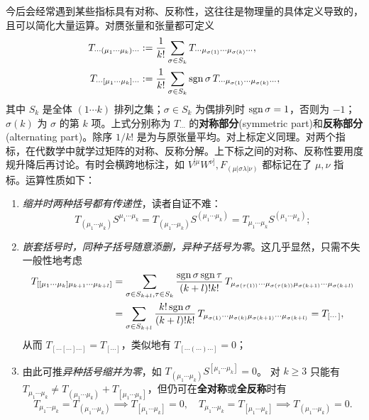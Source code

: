 今后会经常遇到某些指标具有对称、反称性，这往往是物理量的具体定义导致的，且可以简化大量运算。对赝张量和张量都可定义
\begin{align}
    T_{\cdots(\mu_1\cdots\mu_k)\cdots}&:=\frac{1}{k!}\sum_{\sigma\in S_k} T_{\cdots\mu_{\sigma(1)}\cdots\mu_{\sigma(k)}\cdots},\\
    T_{\cdots[\mu_1\cdots\mu_k]\cdots}&:=\frac{1}{k!}\sum_{\sigma\in S_k} \operatorname{sgn}\sigma\,T_{\cdots\mu_{\sigma(1)}\cdots\mu_{\sigma(k)}\cdots},
\end{align}
其中 $S_k$ 是全体 $(1\cdots k)$ 排列之集；$\sigma\in S_k$ 为偶排列时 $\operatorname{sgn}\sigma=1$，否则为 $-1$；$\sigma(k)$ 为 $\sigma$ 的第 $k$ 项。上式分别称为 $T_{\cdots}$ 的\textbf{对称部分}(symmetric part)和\textbf{反称部分}(alternating part)。除序 $1/k!$ 是为与原张量平均。对上标定义同理。对两个指标，在代数学中就学过矩阵的对称、反称分解。上下标之间的对称、反称性要用度规升降后再讨论。有时会横跨地标注，如 $V^{[\mu}W^{\nu]},F_{(\mu|\sigma\lambda|\nu)}$ 都标记在了 $\mu,\nu$ 指标。运算性质如下：
\begin{enumerate}
    \item \textit{缩并时两种括号都有传递性}，读者自证不难：
    \[T_{(\mu_1\cdots\mu_k)}S^{\mu_1\cdots\mu_k}=T_{(\mu_1\cdots\mu_k)}S^{(\mu_1\cdots\mu_k)}=T_{\mu_1\cdots\mu_k}S^{(\mu_1\cdots\mu_k)};\]
    \item \textit{嵌套括号时，同种子括号随意添删，异种子括号为零}。这几乎显然，只需不失一般性地考虑
    \begin{align*}
        T_{[[\mu_1\cdots\mu_k]\mu_{k+1}\cdots\mu_{k+l}]}&=\sum_{\sigma\in S_{k+l},\tau\in S_k}\frac{\operatorname{sgn}\sigma\operatorname{sgn}\tau}{(k+l)!k!}\,T_{\mu_{\sigma(\tau(1))}\cdots\mu_{\sigma(\tau(k))}\mu_{\sigma(k+1)}\cdots\mu_{\sigma(k+l)}}\\
        &=\sum_{\sigma\in S_{k+l}}\frac{k!\operatorname{sgn}\sigma}{(k+l)!k!}\,T_{\mu_{\sigma(1)}\cdots\mu_{\sigma(k)}\mu_{\sigma(k+1)}\cdots\mu_{\sigma(k+l)}}=T_{[\cdots]},
    \end{align*}
    从而 $T_{[\cdots[\cdots]\cdots]}=T_{[\cdots]}$，类似地有 $T_{[\cdots(\cdots)\cdots]}=0$；
    \item 由此可推\textit{异种括号缩并为零}，如 $T_{(\mu_1\cdots\mu_k)}S^{[\mu_1\cdots\mu_k]}=0$。
    对 $k\geqslant 3$ 只能有 $T_{\mu_1\cdots\mu_k}\ne T_{(\mu_1\cdots\mu_k)}+T_{[\mu_1\cdots\mu_k]}$，但仍可在\textbf{全对称}或\textbf{全反称}时有
    \[T_{\mu_1\cdots\mu_k}=T_{(\mu_1\cdots\mu_k)}\implies T_{[\mu_1\cdots\mu_k]}=0,\quad
        T_{\mu_1\cdots\mu_k}=T_{[\mu_1\cdots\mu_k]}\implies T_{(\mu_1\cdots\mu_k)}=0.\]
\end{enumerate}

